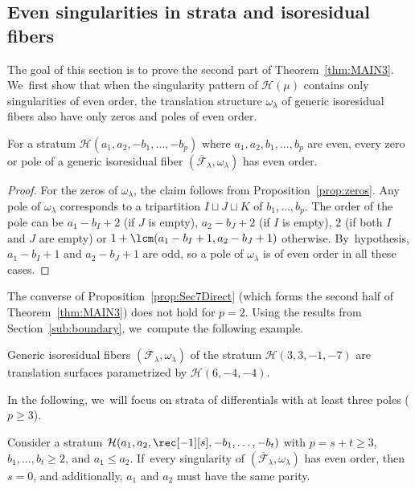 \subsection{Even singularities in strata and isoresidual fibers}\label{sub:7even}

The goal of this section is to prove the second part of Theorem~\ref{thm:MAIN3}. We~first show that when the singularity pattern of $\mathcal{H}(\mu)$ contains only singularities of even order, the translation structure $\omega_\lambda$ of generic isoresidual fibers also have only zeros and poles of even order.

\begin{prop}\label{prop:Sec7Direct}
For a stratum $\mathcal{H}(a_{1},a_{2},-b_{1},\dots,-b_{p})$ where $a_{1},a_{2},b_{1},\dots,b_{p}$ are even, every zero or pole of a generic isoresidual fiber $(\overline{\mathcal{F}}_{\lambda},\omega_{\lambda})$ has even order.
\end{prop}

\begin{proof}
For the zeros of $\omega_{\lambda}$, the claim follows from Proposition~\ref{prop:zeros}. Any pole of $\omega_{\lambda}$ corresponds to a tripartition $I \sqcup J \sqcup K$ of $b_{1},\dots,b_{p}$. The order of the pole can be $a_{1}-b_{I}+2$ (if $J$ is empty), $a_{2}-b_{J}+2$ (if $I$ is empty), $2$ (if both $I$ and $J$ are empty) or $1+\lcm(a_{1}-b_{I}+1,a_{2}-b_{J}+1)$ otherwise. By~hypothesis, $a_{1}-b_{I}+1$ and $a_{2}-b_{J}+1$ are odd, so a pole of $\omega_{\lambda}$ is of even order in all these cases.
\end{proof}

The converse of Proposition~\ref{prop:Sec7Direct} (which forms the second half of Theorem~\ref{thm:MAIN3}) does not hold for $p=2$. Using the results from Section~\ref{sub:boundary}, we~compute the following example.

\begin{ex}
Generic isoresidual fibers $(\overline{\mathcal{F}}_{\lambda},\omega_{\lambda})$ of the stratum $\mathcal{H}(3,3,-1,-7)$ are translation surfaces parametrized by $\mathcal{H}(6,-4,-4)$.
\end{ex}

In the following, we~will focus on strata of differentials with at least three poles (\ie $p\geq 3$).

\begin{lem}\label{lem:nosimplepole}
Consider a stratum $\mathcal{H}(a_{1},a_{2},\rec[-1][s],-b_{1},\dots,-b_{t})$ with $p=s+t \geq 3$, $b_{1},\dots,b_{t} \geq 2$, and $a_{1} \leq a_{2}$. If~every singularity of $(\overline{\mathcal{F}}_{\lambda},\omega_{\lambda})$ has even order, then $s=0$, and additionally, $a_{1}$ and $a_{2}$ must have the same parity.
\end{lem}

